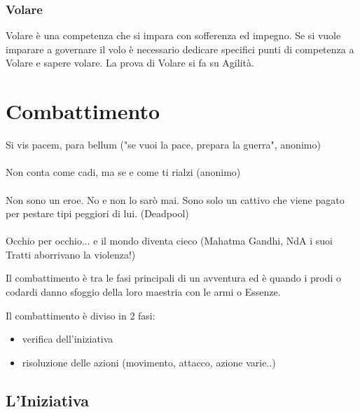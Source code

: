 \documentclass[a4paper,11pt,twoside,openany]{book}
\begin{document}
\subsubsection{Volare}

\label{volare}

Volare è una competenza che si impara con sofferenza ed impegno. Se si vuole imparare a governare il volo è necessario dedicare specifici punti di competenza a Volare e sapere volare.
La prova di Volare si fa su Agilità.

\pagebreak

\section{Combattimento}

\label{combattimento}
\begin{tcolorbox}[enhanced,arc=5pt,boxrule=0.3pt]{
		Si vis pacem, para bellum ("se vuoi la pace, prepara la guerra", anonimo)\\\\
		Non conta come cadi, ma se e come ti rialzi (anonimo)\\\\
		Non sono un eroe. No e non lo sarò mai. Sono solo un cattivo che viene pagato per pestare tipi peggiori di lui. (Deadpool)\\\\
		Occhio per occhio... e il mondo diventa cieco (Mahatma Gandhi, NdA i suoi Tratti aborrivano la violenza!)
	}\end{tcolorbox}\medskip

Il combattimento è tra le fasi principali di un avventura ed è quando i prodi o codardi danno sfoggio della loro maestria con le armi o Essenze.

\bigskip

Il combattimento è diviso in 2 fasi:
\begin{itemize}
	\item verifica dell'iniziativa
	\item risoluzione delle azioni (movimento, attacco, azione varie..)
\end{itemize}

\subsection{L'Iniziativa}

\label{liniziativa}
\end{document}
